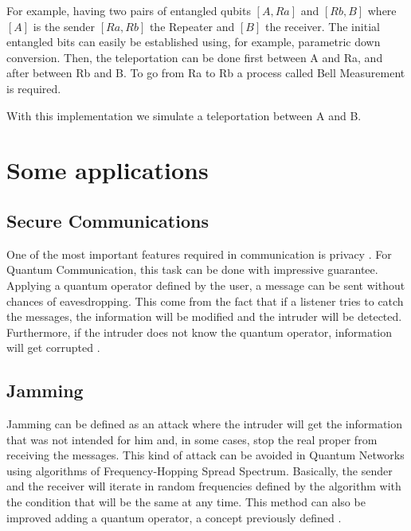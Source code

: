 \documentclass[12pt,journal]{journal}
\begin{document}
\begin{itemize}
For example, having two pairs of entangled qubits $[A, Ra]$ and $[Rb, B]$ where $[A]$ is the sender $[Ra, Rb]$ the Repeater and $[B]$ the receiver. The initial entangled bits can easily be established using, for example, parametric down conversion. Then, the teleportation can be done first between A and Ra, and after between Rb and B.  To go from Ra to Rb a process called Bell Measurement is required.


With this implementation we simulate a teleportation between A and B.


\end{itemize}



\section{Some applications}

\subsection{Secure Communications}

One of the most important features required in communication is privacy \citep{metwaly2015architecture}. For Quantum Communication, this task can be done with impressive guarantee.  Applying a quantum operator defined by the user, a message can be sent without chances of eavesdropping. This come from the fact that if a listener tries to catch the messages, the information will be modified and the intruder will be detected. Furthermore, if the intruder does not know the quantum operator, information will get corrupted \citep{wiki:xxx}.

\subsection{Jamming}

Jamming can be defined as an attack where the intruder will get the information that was not intended for him and, in some cases, stop the real proper from receiving the messages.  This kind of attack can be avoided in Quantum Networks using algorithms of Frequency-Hopping Spread Spectrum. Basically, the sender and the receiver will iterate in random frequencies defined by the algorithm with the condition that will be the same at any time. This method can also be improved adding a quantum operator, a concept previously defined \citep{wiki:xxx}.


 


 
\end{document}
